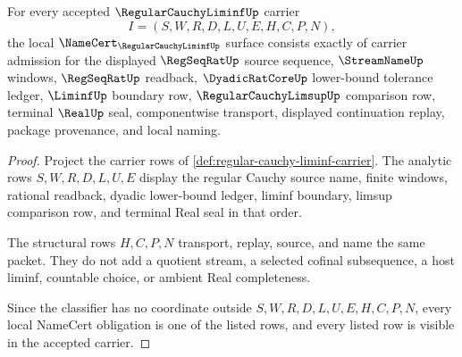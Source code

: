 \begin{theorem}
\label{thm:regular-cauchy-liminf-namecert-obligations}
For every accepted $\RegularCauchyLiminfUp$ carrier
$$
I=(S,W,R,D,L,U,E,H,C,P,N),
$$
the local $\NameCert_{\RegularCauchyLiminfUp}$ surface consists exactly of carrier admission for the displayed $\RegSeqRatUp$ source sequence, $\StreamNameUp$ windows, $\RegSeqRatUp$ readback, $\DyadicRatCoreUp$ lower-bound tolerance ledger, $\LiminfUp$ boundary row, $\RegularCauchyLimsupUp$ comparison row, terminal $\RealUp$ seal, componentwise transport, displayed continuation replay, package provenance, and local naming.
\end{theorem}
\begin{proof}
Project the carrier rows of \autoref{def:regular-cauchy-liminf-carrier}. The analytic rows $S,W,R,D,L,U,E$ display the regular Cauchy source name, finite windows, rational readback, dyadic lower-bound ledger, liminf boundary, limsup comparison row, and terminal Real seal in that order.

The structural rows $H,C,P,N$ transport, replay, source, and name the same packet. They do not add a quotient stream, a selected cofinal subsequence, a host liminf, countable choice, or ambient Real completeness.

Since the classifier has no coordinate outside $S,W,R,D,L,U,E,H,C,P,N$, every local NameCert obligation is one of the listed rows, and every listed row is visible in the accepted carrier.
\end{proof}





